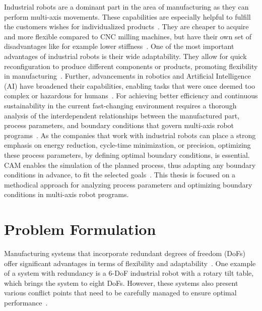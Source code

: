 Industrial robots are a dominant part in the area of manufacturing as they can perform multi-axis movements. These capabilities are especially helpful to fulfill the customers wishes for individualized products~\cite{Sherwani.2020}. They are cheaper to acquire and more flexible compared to \acrshort{CNC} milling machines, but have their own set of disadvantages like for example lower stiffness~\cite{Iglesias.2015, Liberman.2021}. One of the most important advantages of industrial robots is their wide adaptability. They allow for quick reconfiguration to produce different components or products, promoting flexibility in manufacturing~\cite{Billard.2019}. Further, advancements in robotics and Artificial Intelligence (\acrshort{AI}) have broadened their capabilities, enabling tasks that were once deemed too complex or hazardous for humans~\cite{Goel.2020}. 
For achieving better efficiency and continuous sustainability in the current fast-changing environment requires a thorough analysis of the interdependent relationships between the manufactured part, process parameters, and boundary conditions that govern multi-axis robot programs~\cite{Pan, Gadaleta.2019}. As the companies that work with industrial robots can place a strong emphasis on energy reduction, cycle-time minimization, or precision, optimizing these process parameters, by defining optimal boundary conditions, is essential. \acrshort{CAM} enables the simulation of the planned process, thus adapting any boundary conditions in advance, to fit the selected goals~\cite{Kyratsis.2020,Maiti.2017,Pan,Uhlmann.2016}.
This thesis is focused on a methodical approach for analyzing process parameters and optimizing boundary conditions in multi-axis robot programs. 

\section{Problem Formulation}\label{Problem Formulation}
Manufacturing systems that incorporate redundant degrees of freedom (\acrshort{DoF}s) offer significant advantages in terms of flexibility and adaptability~\cite{Anjum.2022}. One example of a system with redundancy is a 6-\acrshort{DoF} industrial robot with a rotary tilt table, which brings the system to eight \acrshort{DoF}s. However, these systems also present various conflict points that need to be carefully managed to ensure optimal performance~\cite{Boscariol.2020}.


